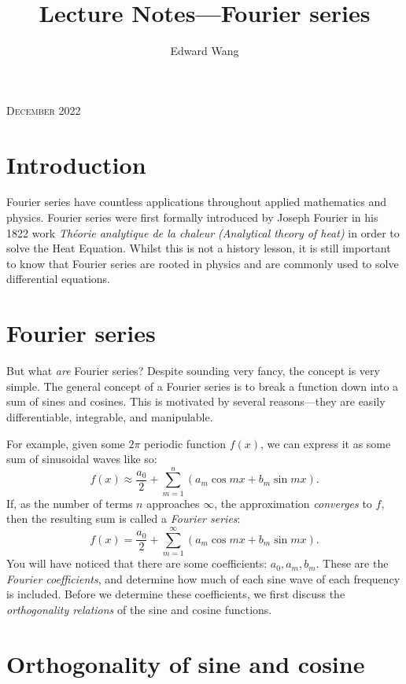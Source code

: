 \documentclass{amsart}
\title{Lecture Notes---Fourier series}
\author{Edward Wang}
\begin{document}
  \maketitle
  \begin{center}
    \scshape December 2022 \vspace{1em}
  \end{center}
  \tableofcontents
  
  \section{Introduction}

  Fourier series have countless applications throughout applied mathematics and physics. Fourier series were first formally introduced by Joseph Fourier in his 1822 work \emph{Théorie analytique de la chaleur (Analytical theory of heat)} in order to solve the Heat Equation. Whilst this is not a history lesson, it is still important to know that Fourier series are rooted in physics and are commonly used to solve differential equations.

  \section{Fourier series}

  But what \emph{are} Fourier series? Despite sounding very fancy, the concept is very simple. The general concept of a Fourier series is to break a function down into a sum of sines and cosines. This is motivated by several reasons---they are easily differentiable, integrable, and manipulable.

  For example, given some $2\pi$ periodic function $f(x)$, we can express it as some sum of sinusoidal waves like so:
  \[
    f(x) \approx \frac{a_0}{2} + \sum_{m=1}^{n} (a_m \cos mx + b_m \sin mx)
  .\] If, as the number of terms $n$ approaches $\infty$, the approximation \emph{converges} to $f$, then the resulting sum is called a \emph{Fourier series}:
  \[
    f(x) = \frac{a_0}{2} + \sum_{m=1}^{\infty} (a_m \cos mx + b_m \sin mx)
  .\] You will have noticed that there are some coefficients: $a_0, a_m, b_m$. These are the \emph{Fourier coefficients}, and determine how much of each sine wave of each frequency is included. Before we determine these coefficients, we first discuss the \emph{orthogonality relations} of the sine and cosine functions.

  \section{Orthogonality of sine and cosine}
\end{document}
